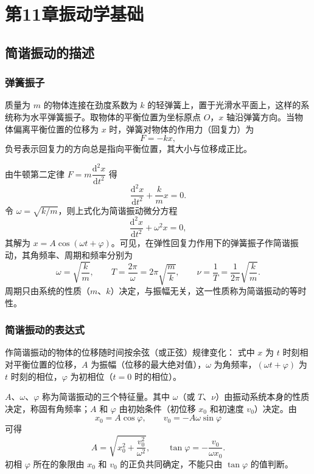 \chapter{第11章\texorpdfstring{\hspace{0.5em}}{ }振动学基础}

\section{简谐振动的描述}
    \subsection{弹簧振子}
    质量为 $m$ 的物体连接在劲度系数为 $k$ 的轻弹簧上，置于光滑水平面上，这样的系统称为水平弹簧振子。取物体的平衡位置为坐标原点 $O$，$x$ 轴沿弹簧方向。当物体偏离平衡位置的位移为 $x$ 时，弹簧对物体的作用力（回复力）为
    \[
    F=-kx,
    \]
    负号表示回复力的方向总是指向平衡位置，其大小与位移成正比。

    由牛顿第二定律 $F=m\dfrac{\mathrm{d}^{2}x}{\mathrm{d}t^{2}}$ 得
    \[
    \frac{\mathrm{d}^{2}x}{\mathrm{d}t^{2}}+\frac{k}{m}x=0.
    \]
    令 $\omega=\sqrt{k/m}$，则上式化为简谐振动微分方程
    \[
    \frac{\mathrm{d}^{2}x}{\mathrm{d}t^{2}}+\omega^{2}x=0,
    \]
    其解为 $x=A\cos(\omega t+\varphi)$。可见，在弹性回复力作用下的弹簧振子作简谐振动，其角频率、周期和频率分别为
    \[
    \omega=\sqrt{\frac{k}{m}},\qquad
    T=\frac{2\pi}{\omega}=2\pi\sqrt{\frac{m}{k}},\qquad
    \nu=\frac{1}{T}=\frac{1}{2\pi}\sqrt{\frac{k}{m}}.
    \]
    周期只由系统的性质（$m$、$k$）决定，与振幅无关，这一性质称为简谐振动的等时性。

    \subsection{简谐振动的表达式}
    作简谐振动的物体的位移随时间按余弦（或正弦）规律变化：
    式中 $x$ 为 $t$ 时刻相对平衡位置的位移，$A$ 为振幅（位移的最大绝对值），$\omega$ 为角频率，$(\omega t+\varphi)$ 为 $t$ 时刻的相位，$\varphi$ 为初相位（$t=0$ 时的相位）。

    $A$、$\omega$、$\varphi$ 称为简谐振动的三个特征量。其中 $\omega$（或 $T$、$\nu$）由振动系统本身的性质决定，称固有角频率；$A$ 和 $\varphi$ 由初始条件（初位移 $x_0$ 和初速度 $v_0$）决定。由
    \[
    x_0=A\cos\varphi,\qquad v_0=-A\omega\sin\varphi
    \]
    可得
    \[
    A=\sqrt{x_0^{2}+\frac{v_0^{2}}{\omega^{2}}},\qquad
    \tan\varphi=-\frac{v_0}{\omega x_0}.
    \]
    初相 $\varphi$ 所在的象限由 $x_0$ 和 $v_0$ 的正负共同确定，不能只由 $\tan\varphi$ 的值判断。

